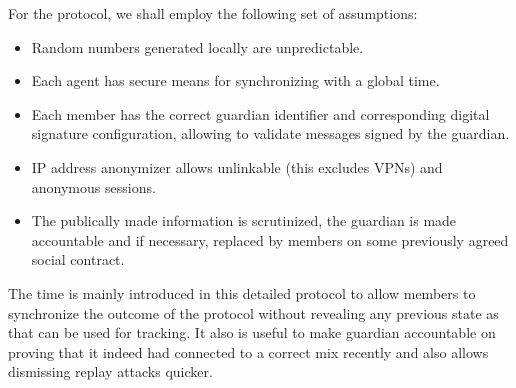 \documentclass[12pt]{article}
\begin{document}

\begin{doublespace}

  
\end{doublespace}

For the protocol, we shall employ the following set of assumptions:
\begin{itemize}
\item Random numbers generated locally are unpredictable.
\item Each agent has secure means for synchronizing with a global time.
\item Each member has the correct guardian identifier and corresponding digital signature configuration, allowing to validate messages signed by the guardian. 
\item IP address anonymizer allows unlinkable (this excludes VPNs) and anonymous sessions.
\item The publically made information is scrutinized, the guardian is made accountable and if necessary, replaced by members on some previously agreed social contract. 
\end{itemize}
The time is mainly introduced in this detailed protocol to allow members to synchronize the outcome of the protocol without revealing any previous state as that can be used for tracking. It also is useful to make guardian accountable on proving that it indeed had connected to a correct mix recently and also allows dismissing replay attacks quicker. 
\end{document}
